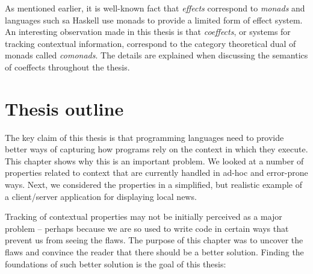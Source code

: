 As mentioned earlier, it is well-known fact that \emph{effects} correspond to \emph{monads} and
languages such sa Haskell use monads to provide a limited form of effect system. An interesting 
observation made in this thesis is that \emph{coeffects}, or systems for tracking contextual
information, correspond to the category theoretical dual of monads called \emph{comonads}. The
details are explained when discussing the semantics of coeffects throughout the thesis.


\section{Thesis outline}

The key claim of this thesis is that programming languages need to provide better ways of capturing
how programs rely on the context in which they execute. This chapter shows why this is an important
problem. We looked at a number of properties related to context that are currently handled in 
ad-hoc and error-prone ways. Next, we considered the properties in a simplified, but realistic 
example of a client/server application for displaying local news. 

Tracking of contextual properties may not be initially perceived as a major problem -- perhaps 
because we are so used to write code in certain ways that prevent us from seeing the flaws. The 
purpose of this chapter was to uncover the flaws and convince the reader that there should be a 
better solution. Finding the foundations of such better solution is the goal of this thesis:

